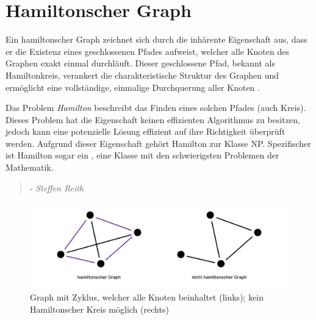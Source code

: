 \section{Hamiltonscher Graph}

Ein hamiltonscher Graph zeichnet sich durch die inhärente Eigenschaft aus, dass er die Existenz eines geschlossenen Pfades aufweist, welcher alle Knoten des Graphen exakt einmal durchläuft. Dieser geschlossene Pfad, bekannt als Hamiltonkreis, verankert die charakteristische Struktur des Graphen und ermöglicht eine vollständige, einmalige Durchquerung aller Knoten \cite{brandstadt1994eulerkreise, ohlbach2018graphen}.

Das Problem \emph{Hamilton} beschreibt das Finden eines solchen Pfades (auch Kreis). Dieses Problem hat die Eigenschaft keinen effizienten Algorithmus zu besitzen, jedoch kann eine potenzielle Lösung effizient auf ihre Richtigkeit überprüft werden. Aufgrund dieser Eigenschaft gehört Hamilton zur Klasse NP. Spezifischer ist Hamilton sogar ein , eine Klasse mit den schwierigsten Problemen der Mathematik.

\begin{quote}
     - \textit{Steffen Reith}
    \cite{reith2001p}
\end{quote}

\begin{figure}
    \centering
    \includegraphics[width=1\textwidth]{content/img/Research/Graphen/HamiltonscherGraph.png}
    \caption{Graph mit Zyklus, welcher alle Knoten beinhaltet (links); kein Hamiltonscher Kreis möglich (rechts)}
    \label{fig:hamiltonsche}
\end{figure}
\FloatBarrier